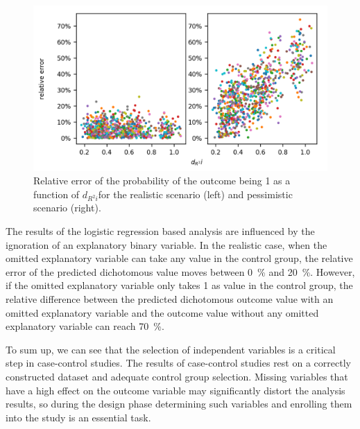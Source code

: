 		\begin{figure}[h!]
			\centering
                \captionsetup{justification=centering}
			\includegraphics[width=\textwidth]{assets/figures/control_group_selection/missing/relative_error.png}
			\caption{Relative error of the probability of the outcome being 1 as a function of $d_{R^{2}i}$for the realistic scenario (left) and pessimistic scenario (right). %
			}
			\label{fig:missing_relative_error}
		\end{figure}
								
		The results of the logistic regression based analysis are influenced by the ignoration of an explanatory binary variable. In the realistic case, when the omitted explanatory variable can take any value in the control group, the relative error of the predicted dichotomous value moves between \SI{0}{\percent} and \SI{20}{\percent}. However, if the omitted explanatory variable only takes 1 as value in the control group, the relative difference between the predicted dichotomous outcome value with an omitted explanatory variable and the outcome value without any omitted explanatory variable can reach \SI{70}{\percent}.
  
        To sum up, we can see that the selection of independent variables is a critical step in case-control studies. The results of case-control studies rest on a correctly constructed dataset and adequate control group selection. Missing variables that have a high effect on the outcome variable may significantly distort the analysis results, so during the design phase determining such variables and enrolling them into the study is an essential task.
								
